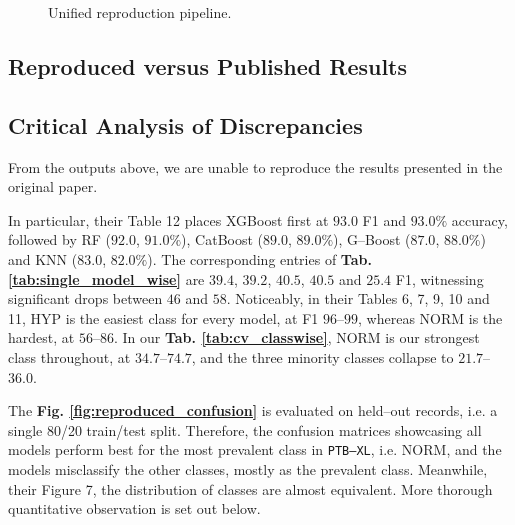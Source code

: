 \begin{figure}[H]
\caption{Unified reproduction pipeline.}
\label{fig:pipeline}
\end{figure}

\subsection{Reproduced versus Published Results}



\subsection{Critical Analysis of Discrepancies}
\label{sec:part_1_discrepancy}

From the outputs above, we are unable to reproduce the results presented in the original paper.

In particular, their Table 12 places XGBoost first at $93.0$ F1 and $93.0\%$ accuracy, followed by RF ($92.0$, $91.0\%$), CatBoost ($89.0$, $89.0\%$), G–Boost ($87.0$, $88.0\%$) and KNN ($83.0$, $82.0\%$). 
The corresponding entries of \textbf{Tab. \ref{tab:single_model_wise}} are $39.4$, $39.2$, $40.5$, $40.5$ and $25.4$ F1, witnessing significant drops between $46$ and $58$. 
Noticeably, in their Tables 6, 7, 9, 10 and 11, HYP is the easiest class for every model, at F1 $96$–$99$, whereas NORM is the hardest, at $56$–$86$. 
In our \textbf{Tab. \ref{tab:cv_classwise}}, NORM is our strongest class throughout, at $34.7$–$74.7$, and the three minority classes collapse to $21.7$–$36.0$.

The \textbf{Fig. \ref{fig:reproduced_confusion}} is evaluated on held–out records, i.e. a single 80/20 train/test split. Therefore, the confusion matrices showcasing all models perform best for the most prevalent class in \texttt{PTB–XL}, i.e. NORM, and the models misclassify the other classes, mostly as the prevalent class.
Meanwhile, their Figure 7, the distribution of classes are almost equivalent. More thorough quantitative observation is set out below.


